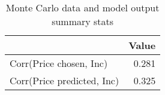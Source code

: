 \begin{table}[!ht]
	\centering
		\caption{Monte Carlo data and model output summary stats}
\begin{tabular}{lr}
		\toprule
               &     Value\\
		\midrule
		Corr(Price chosen, Inc)&     0.281\\
		Corr(Price predicted, Inc)&     0.325\\
		\bottomrule
	\end{tabular}
\end{table}
